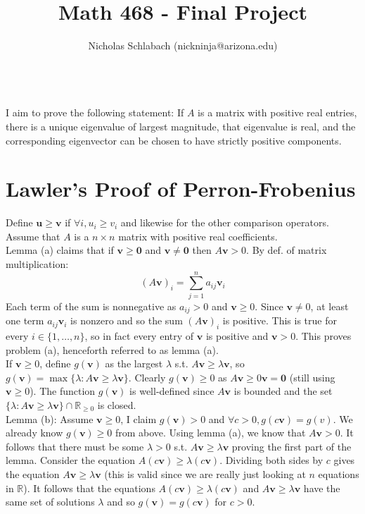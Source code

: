 \documentclass[14pt,letterpaper]{extarticle}
\title{Math 468 - Final Project}
\author{Nicholas Schlabach (nickninja@arizona.edu)}
\date{\DTMUsedate{titledate}}
\newcommand*{\bv}{\mathbf{v}}
\newcommand*{\bu}{\mathbf{u}}
\newcommand*{\bvz}{\mathbf{0}}
\newcommand*{\R}{\mathbb{R}}
\begin{document}
\pagestyle{fancy}
\fancyhead[C]{\hspace{5mm}\Big(\thetitle{}\Big)}
\fancyfoot{} %
\maketitle
\thispagestyle{fancy}

\text{ } \\
I aim to prove the following statement: If $A$ is a matrix with positive real entries, there is a unique eigenvalue of largest magnitude, that eigenvalue is real, and the corresponding eigenvector can be chosen to have strictly positive components.
\section*{Lawler's Proof of Perron-Frobenius}
Define $\bu\ge \bv$ if $\forall i, u_i\ge v_i$ and likewise for the other comparison operators. 
\vspace{5mm} \\
Assume that $A$ is a $n \times n$ matrix with positive real coefficients. 
\vspace{2mm} \\
Lemma (a) claims that if $\bv\ge \bvz$ and $\bv \ne \bvz$ then $A\bv>0$. By def. of matrix multiplication: 
        \[ (A\bv)_i=\sum_{j=1}^n a_{ij}\bv_i \]
        Each term of the sum is nonnegative as $a_{ij}>0$ and $\bv\ge 0$. Since $\bv\ne 0$, at least one term $a_{ij}\bv_i$ is nonzero and so the sum $(A\bv)_i$ is positive. This is true for every $i \in \{1,\dots,n\}$, so in fact every entry of $\bv$ is positive and $\bv>0$. This proves problem (a), henceforth referred to as lemma (a).
\vspace{2mm} \\
If $\bv\ge 0$, define $g(\bv)$ as the largest $\lambda$ s.t. $A\bv\ge \lambda \bv$, so $g(\bv)=\max\{\lambda:A\bv \ge \lambda \bv\}$. Clearly $g(\bv) \ge 0$ as $A\bv \ge 0\bv =\bvz$ (still using $\bv\ge 0$). The function $g(\bv)$ is well-defined since $A\bv$ is bounded and the set $\{\lambda:A\bv \ge \lambda \bv\}\cap \mathbb{R}_{\ge0}$ is closed.
\vspace{2mm} \\
Lemma (b): Assume $\bv\ge 0$, I claim $g(\bv)>0$ and $\forall c>0, g(c\bv)=g(v)$. We already know $g(\bv)\ge 0$ from above. Using lemma (a), we know that $A\bv>0$. It follows that there must be some $\lambda>0$ s.t. $A\bv\ge \lambda\bv$ proving the first part of the lemma. Consider the equation $A(c\bv)\ge \lambda (c\bv)$. Dividing both sides by $c$ gives the equation $A\bv\ge \lambda\bv$ (this is valid since we are really just looking at $n$ equations in $\R$). It follows that the equations $A(c\bv)\ge \lambda (c\bv)$ and $A\bv\ge \lambda \bv$ have the same set of solutions $\lambda$ and so $g(\bv)=g(c\bv)$ for $c>0$.
\end{document}

